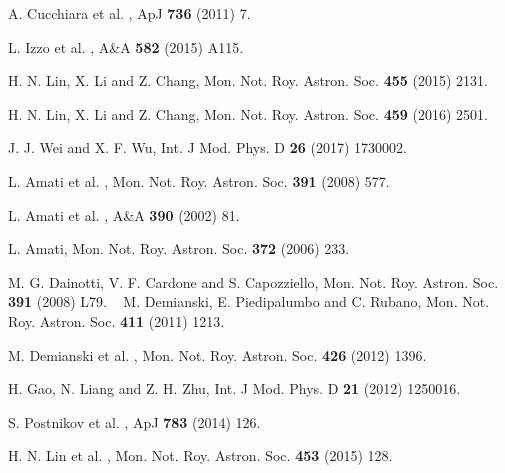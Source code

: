 \documentclass[12pt]{report}
\begin{document}
\begin{thebibliography}{99}
 A. Cucchiara et al. , ApJ \textbf{736} (2011) 7.

 L. Izzo et al. ,  A\&A \textbf{582} (2015) A115.

 H. N. Lin, X. Li and Z. Chang,   Mon. Not. Roy. Astron. Soc. \textbf{455} (2015) 2131.

H. N. Lin, X. Li and Z. Chang,   Mon. Not. Roy. Astron. Soc. \textbf{459} (2016) 2501.

 J. J. Wei and X. F. Wu,  Int. J Mod. Phys. D \textbf{26} (2017) 1730002.

 L. Amati et al. ,   Mon. Not. Roy. Astron. Soc. \textbf{391} (2008) 577.
 
 L. Amati et al. ,  A\&A \textbf{390} (2002) 81.

 L. Amati,  Mon. Not. Roy. Astron. Soc. \textbf{372} (2006) 233.

 M. G. Dainotti, V. F. Cardone and S. Capozziello,  Mon. Not. Roy. Astron. Soc. \textbf{391} (2008) L79.
\
 M. Demianski, E. Piedipalumbo and C. Rubano,  Mon. Not. Roy. Astron. Soc. \textbf{411} (2011) 1213.

 M. Demianski et al. ,  Mon. Not. Roy. Astron. Soc. \textbf{426} (2012) 1396.

 H. Gao, N. Liang and  Z. H. Zhu,  Int. J Mod. Phys. D \textbf{21} (2012) 1250016.

 S. Postnikov et al. , ApJ \textbf{783} (2014) 126.

 H. N. Lin et al. ,  Mon. Not. Roy. Astron. Soc. \textbf{453} (2015) 128.




\end{thebibliography}
\end{document}
